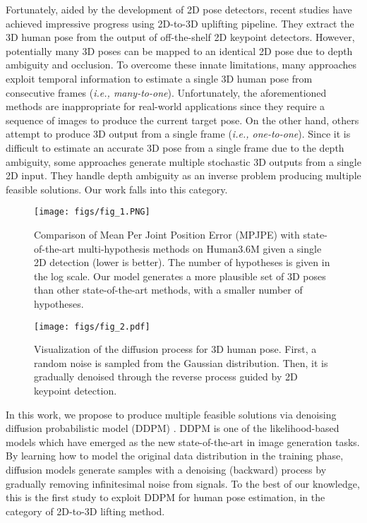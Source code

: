 \documentclass[letterpaper, 10 pt, conference]{ieeeconf}
\begin{document}
Fortunately, aided by the development of 2D pose detectors, recent studies \cite{Liu_2020_CVPR, chen2020anatomy, wang2020motion} have achieved impressive progress using 2D-to-3D uplifting pipeline.
They extract the 3D human pose from the output of off-the-shelf 2D keypoint detectors.
However, potentially many 3D poses can be mapped to an identical 2D pose due to depth ambiguity and occlusion. To overcome these innate limitations, many approaches \cite{pavllo20193d,zheng20213d,li2022exploiting} exploit temporal information to estimate a single 3D human pose from consecutive frames (\textit{i.e., many-to-one}).
Unfortunately, the aforementioned methods are inappropriate for real-world applications since they require a sequence of images to produce the current target pose.
On the other hand, others \cite{martinez2017simple, zhao2019semantic, wehrbein2021probabilistic} attempt to produce 3D output from a single frame (\textit{i.e., one-to-one}).
Since it is difficult to estimate an accurate 3D pose from a single frame due to the depth ambiguity, some approaches \cite{jahangiri2017generating,sharma2019monocular,li2020weakly,wehrbein2021probabilistic,li2022mhformer} generate multiple stochastic 3D outputs from a single 2D input.
They handle depth ambiguity as an inverse problem producing multiple feasible solutions.
Our work falls into this category.

\begin{figure}[t]
    \centering
    \texttt{[image: figs/fig\_1.PNG]}
    \caption{Comparison of Mean Per Joint Position Error (MPJPE) with state-of-the-art multi-hypothesis methods on Human3.6M given a single 2D detection (lower is better). The number of hypotheses is given in the log scale. Our model generates a more plausible set of 3D poses than other state-of-the-art methods, with a smaller number of hypotheses.}
    \vspace{-20pt}
    \label{fig:1}
\end{figure}
\label{sec:intro}
\begin{figure*}[t]
        \centering
    \texttt{[image: figs/fig\_2.pdf]}
    \caption{Visualization of the diffusion process for 3D human pose. First, a random noise  is sampled from the Gaussian distribution. Then, it is gradually denoised through the reverse process guided by 2D keypoint detection.}
    \label{fig:2}
    \vspace{-10pt}
\end{figure*}

In this work, we propose to produce multiple feasible solutions via denoising diffusion probabilistic model (DDPM) \cite{ho2020denoising}.
DDPM is one of the likelihood-based models which have emerged as the new state-of-the-art in image generation tasks.
By learning how to model the original data distribution in the training phase, diffusion models generate samples with a denoising (backward) process by gradually removing infinitesimal noise from signals.
To the best of our knowledge, this is the first study to exploit DDPM for human pose estimation, in the category of 2D-to-3D lifting method.
\end{document}
